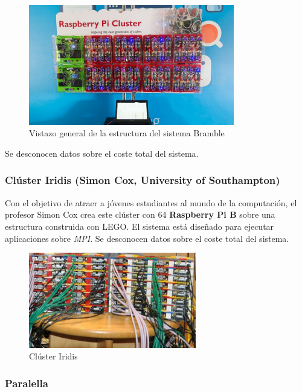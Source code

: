 \begin{figure}[H]
  \centering
  \includegraphics[width=0.8\textwidth]{Chapters/Chapter4/Figures/bramblegchq}
  \caption[Bramble]{Vistazo general de la estructura del sistema Bramble}
  \label{gchq:bramble}
\end{figure}

Se desconocen datos sobre el coste total del sistema.

\subsubsection{Clúster Iridis (Simon Cox, University of Southampton)}

Con el objetivo de atraer a jóvenes estudiantes al mundo de la computación, el profesor Simon Cox crea este clúster con 64 \textbf{Raspberry Pi B} sobre una estructura construida con LEGO\cite{cox:raspberry}. El sistema está diseñado para ejecutar aplicaciones sobre \textit{MPI}. Se desconocen datos sobre el coste total del sistema.

\begin{figure}[H]
  \centering
  \includegraphics[width=0.65\textwidth]{Chapters/Chapter4/Figures/iridis-pi.jpg}
  \caption[Iridis]{Clúster Iridis}
  \label{cox:iridis}
\end{figure}

\subsubsection{Paralella}

